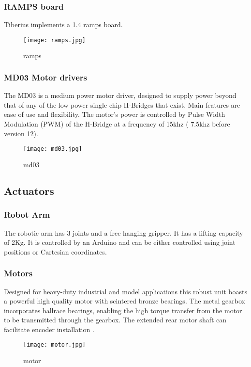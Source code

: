 \subsubsection{RAMPS board}
Tiberius implements a 1.4 ramps board.
\begin{figure}[!htb]
\begin{center}
\texttt{[image: ramps.jpg]}
\end{center}
\caption{ramps}
\label{fig:ramps}
\end{figure}

\subsubsection{MD03 Motor drivers}
The MD03 is a medium power motor driver, designed to supply power beyond that of any of the low power single chip H-Bridges that exist. Main features are ease of use and flexibility. The motor's power is controlled by Pulse Width Modulation (PWM) of the H-Bridge at a frequency of 15khz ( 7.5khz before version 12). 
\begin{figure}[!htb]
\begin{center}
\texttt{[image: md03.jpg]}
\end{center}
\caption{md03}
\label{fig:md03}
\end{figure}



\subsection{Actuators}
\subsubsection{Robot Arm}
The robotic arm has 3 joints and a free hanging gripper. It has a lifting capacity of 2Kg. It is controlled by an Arduino and can be either controlled using joint positions or Cartesian coordinates.
\subsubsection{Motors}
Designed for heavy-duty industrial and model applications this robust unit boasts a powerful high quality motor with scintered bronze bearings. The metal gearbox incorporates ballrace bearings, enabling the high torque transfer from the motor to be
transmitted through the gearbox. The extended rear motor shaft can facilitate encoder installation \cite{Dun_dcmotor}.
\begin{figure}[!htb]
\begin{center}
\texttt{[image: motor.jpg]}
\end{center}
\caption{motor}
\label{fig:motor}
\end{figure}


